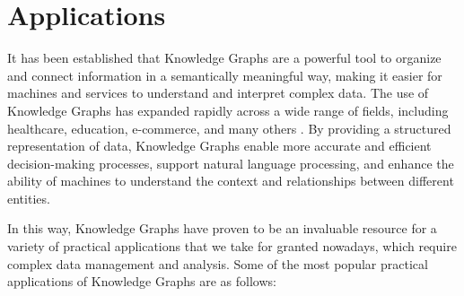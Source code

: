 \section{Applications}\label{sec:kgs-applications}
It has been established that Knowledge Graphs are a powerful tool to organize and connect information in a semantically meaningful way, making it easier for machines and services to understand and interpret complex data. The use of Knowledge Graphs has expanded rapidly across a wide range of fields, including healthcare, education, e-commerce, and many others \cite{peng2023}. By providing a structured representation of data, Knowledge Graphs enable more accurate and efficient decision-making processes, support natural language processing, and enhance the ability of machines to understand the context and relationships between different entities. 

In this way, Knowledge Graphs have proven to be an invaluable resource for a variety of practical applications that we take for granted nowadays, which require complex data management and analysis. Some of the most popular practical applications of Knowledge Graphs are as follows:

